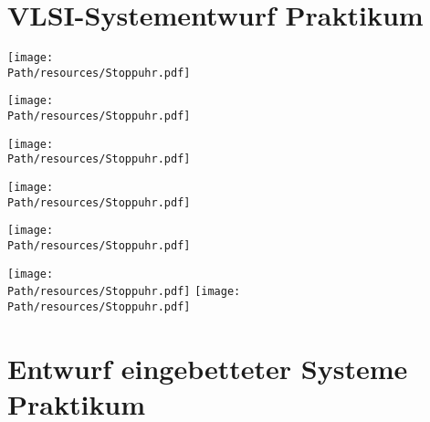 \chapter{VLSI-Systementwurf Praktikum}
	\def \Path {/media/Daten/Studium/Skripte/TechnischeInformatik/resources/Praktikum/VLSI/Abgabe/Protokolle}

	\begin{center}
	\texttt{[image: \\Path/resources/Stoppuhr.pdf]}
	\end{center}
	
	\begin{center}
	\texttt{[image: \\Path/resources/Stoppuhr.pdf]}
	\end{center}
	
	\begin{center}
	\texttt{[image: \\Path/resources/Stoppuhr.pdf]}
	\end{center}
	
	\begin{center}
	\texttt{[image: \\Path/resources/Stoppuhr.pdf]}
	\end{center}
	
	\begin{center}
	\texttt{[image: \\Path/resources/Stoppuhr.pdf]}
	\end{center}
	
	\begin{center}
	\texttt{[image: \\Path/resources/Stoppuhr.pdf]}
	\texttt{[image: \\Path/resources/Stoppuhr.pdf]}
	\end{center}
	
	
	\def \Path {/media/Daten/Studium/Skripte/TechnischeInformatik}


\chapter{Entwurf eingebetteter Systeme Praktikum}
	
